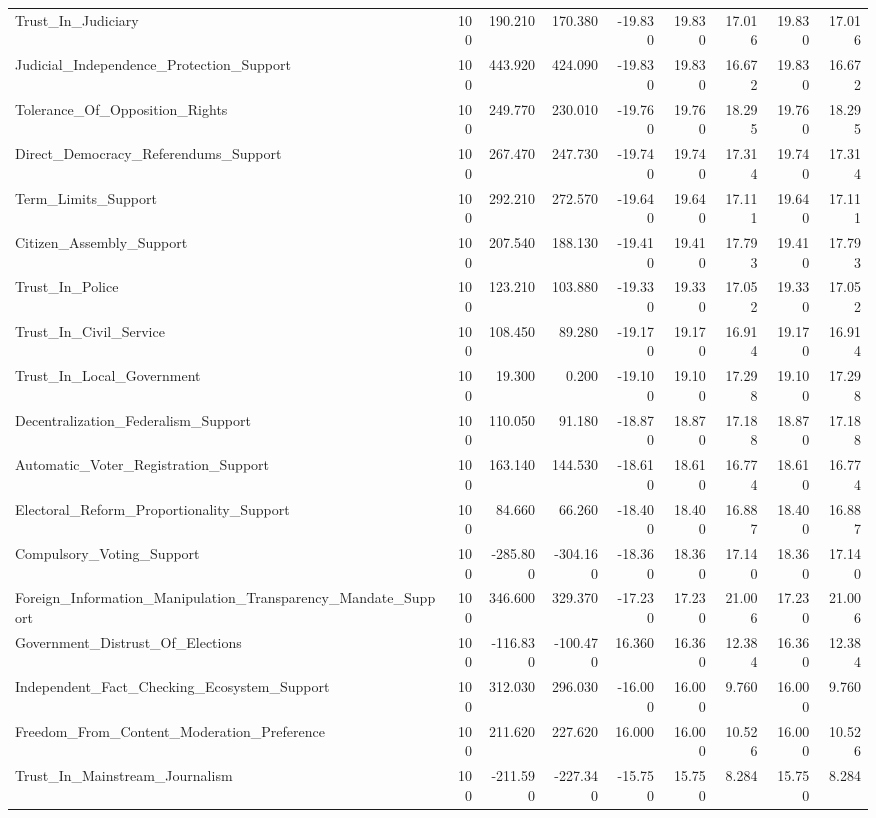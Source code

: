 \begin{table}[htbp]
\begin{threeparttable}
\begin{adjustbox}{max width=\linewidth}
\begin{tabular}{lrrrrrrrr}
Trust\_In\_Judiciary & 100 & 190.210 & 170.380 & -19.830 & 19.830 & 17.016 & 19.830 & 17.016 \\
Judicial\_Independence\_Protection\_Support & 100 & 443.920 & 424.090 & -19.830 & 19.830 & 16.672 & 19.830 & 16.672 \\
Tolerance\_Of\_Opposition\_Rights & 100 & 249.770 & 230.010 & -19.760 & 19.760 & 18.295 & 19.760 & 18.295 \\
Direct\_Democracy\_Referendums\_Support & 100 & 267.470 & 247.730 & -19.740 & 19.740 & 17.314 & 19.740 & 17.314 \\
Term\_Limits\_Support & 100 & 292.210 & 272.570 & -19.640 & 19.640 & 17.111 & 19.640 & 17.111 \\
Citizen\_Assembly\_Support & 100 & 207.540 & 188.130 & -19.410 & 19.410 & 17.793 & 19.410 & 17.793 \\
Trust\_In\_Police & 100 & 123.210 & 103.880 & -19.330 & 19.330 & 17.052 & 19.330 & 17.052 \\
Trust\_In\_Civil\_Service & 100 & 108.450 & 89.280 & -19.170 & 19.170 & 16.914 & 19.170 & 16.914 \\
Trust\_In\_Local\_Government & 100 & 19.300 & 0.200 & -19.100 & 19.100 & 17.298 & 19.100 & 17.298 \\
Decentralization\_Federalism\_Support & 100 & 110.050 & 91.180 & -18.870 & 18.870 & 17.188 & 18.870 & 17.188 \\
Automatic\_Voter\_Registration\_Support & 100 & 163.140 & 144.530 & -18.610 & 18.610 & 16.774 & 18.610 & 16.774 \\
Electoral\_Reform\_Proportionality\_Support & 100 & 84.660 & 66.260 & -18.400 & 18.400 & 16.887 & 18.400 & 16.887 \\
Compulsory\_Voting\_Support & 100 & -285.800 & -304.160 & -18.360 & 18.360 & 17.140 & 18.360 & 17.140 \\
Foreign\_Information\_Manipulation\_Transparency\_Mandate\_Support & 100 & 346.600 & 329.370 & -17.230 & 17.230 & 21.006 & 17.230 & 21.006 \\
Government\_Distrust\_Of\_Elections & 100 & -116.830 & -100.470 & 16.360 & 16.360 & 12.384 & 16.360 & 12.384 \\
Independent\_Fact\_Checking\_Ecosystem\_Support & 100 & 312.030 & 296.030 & -16.000 & 16.000 & 9.760 & 16.000 & 9.760 \\
Freedom\_From\_Content\_Moderation\_Preference & 100 & 211.620 & 227.620 & 16.000 & 16.000 & 10.526 & 16.000 & 10.526 \\
Trust\_In\_Mainstream\_Journalism & 100 & -211.590 & -227.340 & -15.750 & 15.750 & 8.284 & 15.750 & 8.284 \\

\end{tabular}
\end{adjustbox}
\end{threeparttable}
\end{table}

